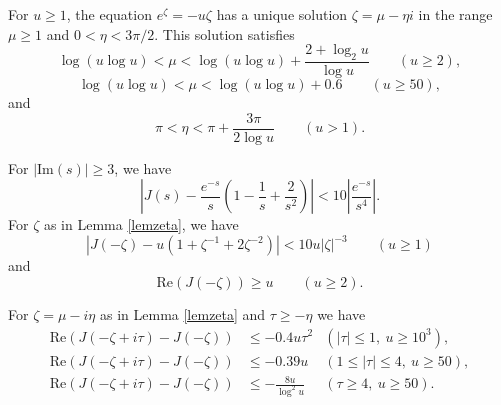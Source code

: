 \documentclass[10pt,a4paper]{amsart}
\begin{document}
\begin{lemma}\label{lemzeta}
For $u\ge 1$, the equation $e^\zeta=-u\zeta$ has a unique solution $\zeta=\mu-\eta i$ in the range $\mu \ge 1$ and $ 0< \eta <3\pi/2$.
This solution satisfies
$$
\log(u\log u)< \mu < \log(u\log u) + \frac{2+\log_2 u}{\log u} \qquad (u\ge 2),
$$
$$
\log(u\log u)< \mu < \log(u\log u) +0.6 \qquad (u\ge 50),
$$
and
$$ \pi <\eta < \pi +  \frac{3 \pi}{2\log u}  \qquad (u > 1).$$
\end{lemma}

\begin{lemma}\label{lemJ}
For $|\mathrm{Im}(s)| \ge 3$, we have
\begin{equation}\label{eqlemJ}
\left|J(s)-\frac{e^{-s}}{s}\left(1-\frac{1}{s}+\frac{2}{s^2}\right) \right| < 10 \left|\frac{e^{-s}}{s^4}\right|.
\end{equation}
For $\zeta$ as in Lemma \ref{lemzeta}, we have 
$$
\left|J(-\zeta)-u(1+\zeta^{-1}+2\zeta^{-2})\right| < 10 u |\zeta|^{-3} \qquad (u\ge 1)
$$
and
$$
\mathrm{Re}(J(-\zeta)) \ge u \qquad (u\ge  2).
$$
\end{lemma}

\begin{lemma}\label{lemReJk}
For $\zeta=\mu-i\eta$ as in Lemma \ref{lemzeta} and $\tau\ge -\eta$ we have
\begin{align*}
\mathrm{Re}(J(-\zeta+i\tau)-J(-\zeta)) & \le -0.4 u \tau^2  & (|\tau|\le 1,\ u\ge 10^3), \\
\mathrm{Re}(J(-\zeta+i\tau)-J(-\zeta)) & \le -0.39 u   &  (1 \le |\tau|\le 4,\ u\ge 50), \\
\mathrm{Re}(J(-\zeta+i\tau)-J(-\zeta)) & \le - \frac{8u}{\log^2 u} &   (\tau \ge 4,\  u \ge 50).
\end{align*}
\end{lemma}
\end{document}
